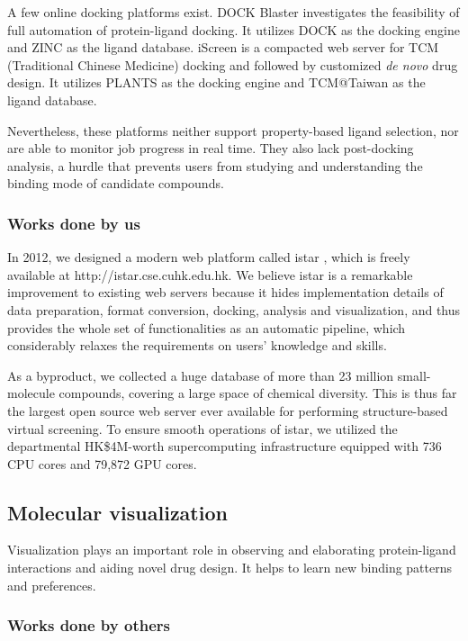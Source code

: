 \documentclass[a4paper,12pt]{article}
\begin{document}
A few online docking platforms exist. DOCK Blaster \cite{557} investigates the feasibility of full automation of protein-ligand docking. It utilizes DOCK \cite{1222} as the docking engine and ZINC \cite{532,1178} as the ligand database. iScreen \cite{899} is a compacted web server for TCM (Traditional Chinese Medicine) docking and followed by customized \textit{de novo} drug design. It utilizes PLANTS \cite{610,607,779} as the docking engine and TCM@Taiwan \cite{528} as the ligand database.

Nevertheless, these platforms neither support property-based ligand selection, nor are able to monitor job progress in real time. They also lack post-docking analysis, a hurdle that prevents users from studying and understanding the binding mode of candidate compounds.

\subsubsection*{Works done by us}

In 2012, we designed a modern web platform called istar \cite{1362}, which is freely available at http://istar.cse.cuhk.edu.hk. We believe istar is a remarkable improvement to existing web servers because it hides implementation details of data preparation, format conversion, docking, analysis and visualization, and thus provides the whole set of functionalities as an automatic pipeline, which considerably relaxes the requirements on users' knowledge and skills.

As a byproduct, we collected a huge database of more than 23 million small-molecule compounds, covering a large space of chemical diversity. This is thus far the largest open source web server ever available for performing structure-based virtual screening. To ensure smooth operations of istar, we utilized the departmental HK\$4M-worth supercomputing infrastructure equipped with 736 CPU cores and 79,872 GPU cores.

\subsection*{Molecular visualization}

Visualization plays an important role in observing and elaborating protein-ligand interactions and aiding novel drug design. It helps to learn new binding patterns and preferences.

\subsubsection*{Works done by others}
\end{document}
